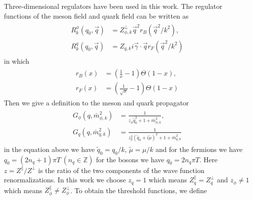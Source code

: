 \documentclass[%
reprint,
superscriptaddress,
showpacs,preprintnumbers,
 amsmath,amssymb,
 aps,
prd,
]{revtex4-1}
\begin{document}
\begin{appendix}
\section{}
Three-dimensional regulators have been used in this work. The regulator functions of the meson field and quark field can be 
written as
\begin{align}
\begin{split}
R^{\phi}_{k}(q_0,\vec{q})&=Z^{\bot}_{\phi,k}\vec{q}^2r_B(\vec{q}^2/k^2) ,\\
R^{q}_{k}(q_0,\vec{q})&=Z_{q,k}i\vec{\gamma}\cdot\vec{q}r_F(\vec{q}^2/k^2)
\end{split}
\end{align} 
in which
\begin{align}
\begin{split}
r_B(x)&=\left( \frac{1}{x}-1 \right)\Theta(1-x) ,\\
r_F(x)&=\left( \frac{1}{\sqrt{x}}-1 \right)\Theta(1-x)
\end{split}
\end{align} 
Then we give a definition to the meson and quark propagator
\begin{align}
\begin{split}
G_\phi(q,\bar{m}^{2}_{\phi,k})&=\frac{1}{z_\phi\tilde{q}^{2}_{0}+1+\bar{m}^{2}_{\phi,k}} ,\\
G_q(q,\bar{m}^{2}_{q,k})&=\frac{1}{z^{2}_{q}(\tilde{q}_0+i\tilde{\mu})^2+1+\bar{m}^{2}_{q,k}}
\end{split}
\end{align} 
in the equation above we have $\tilde{q}_0=q_0/k$, $\tilde{\mu}=\mu/k$ and for the fermions we have
$q_0=(2n_q+1)\pi T \ (n_q\in \mathbb{Z})$ for the bosons we have $q_0=2n_q\pi T$. Here $z=Z^\|/Z^\bot$ is the ratio of the 
two components of the wave function renormalizations. In this work we choose $z_q=1$ which means $Z^{\|}_{q}=
Z^{\bot}_{q}$ and $z_\phi\neq 1$ which means $Z^{\|}_{\phi}\neq Z^{\bot}_{\phi}$. To obtain the threshold functions, we 
define



\end{appendix}
\end{document}
